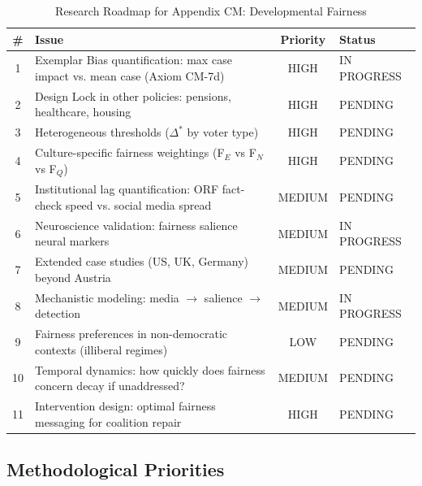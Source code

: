 \begin{table}[htbp]
\centering
\caption{Research Roadmap for Appendix CM: Developmental Fairness}
\label{tab:cm-roadmap}
\renewcommand{\arraystretch}{1.3}
\begin{tabular}{@{}clcl@{}}
\toprule
\textbf{\#} & \textbf{Issue} & \textbf{Priority} & \textbf{Status} \\
\midrule
1 & Exemplar Bias quantification: max case impact vs. mean case (Axiom CM-7d) & HIGH & IN PROGRESS \\
2 & Design Lock in other policies: pensions, healthcare, housing & HIGH & PENDING \\
3 & Heterogeneous thresholds ($\Delta^*$ by voter type) & HIGH & PENDING \\
4 & Culture-specific fairness weightings (F$_E$ vs F$_N$ vs F$_Q$) & HIGH & PENDING \\
5 & Institutional lag quantification: ORF fact-check speed vs. social media spread & MEDIUM & PENDING \\
6 & Neuroscience validation: fairness salience neural markers & MEDIUM & IN PROGRESS \\
7 & Extended case studies (US, UK, Germany) beyond Austria & MEDIUM & PENDING \\
8 & Mechanistic modeling: media $\rightarrow$ salience $\rightarrow$ detection & MEDIUM & IN PROGRESS \\
9 & Fairness preferences in non-democratic contexts (illiberal regimes) & LOW & PENDING \\
10 & Temporal dynamics: how quickly does fairness concern decay if unaddressed? & MEDIUM & PENDING \\
11 & Intervention design: optimal fairness messaging for coalition repair & HIGH & PENDING \\
\bottomrule
\end{tabular}
\end{table}

\subsection{Methodological Priorities}

